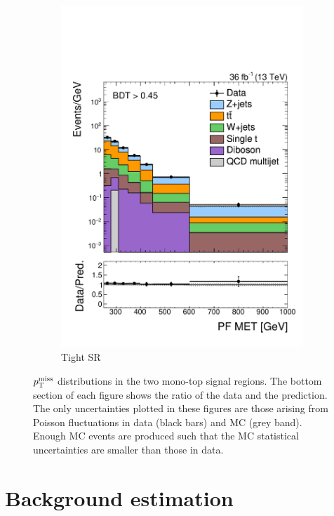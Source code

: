 \begin{figure}[]
\begin{center}
\begin{subfigure}[t]{0.49\textwidth}
            \includegraphics[width=\textwidth]{figures/monotop/prefit/signal_tight_pfmet_logy.pdf}
            \caption{Tight SR}
        \end{subfigure}
        \caption{$p_\mathrm{T}^\mathrm{miss}$ distributions in the two mono-top signal regions.
                 The bottom section of each figure shows the ratio of the data and the prediction.
                 The only uncertainties plotted in these figures are those arising from Poisson fluctuations in data (black bars) and MC (grey band).
                 Enough MC events are produced such that the MC statistical uncertainties are smaller than those in data.}
        \label{fig:mt:prefit_signal}
    \end{center}
\end{figure}

\clearpage

\section{Background estimation}
\label{sec:mt:bkg}

